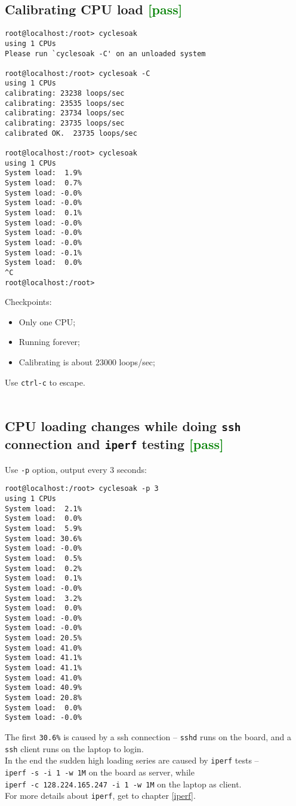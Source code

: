 \documentclass[a4paper]{report}
\begin{document}
\subsection{Calibrating CPU load \textcolor{green}{[pass]}}
\begin{lstlisting}
root@localhost:/root> cyclesoak   
using 1 CPUs
Please run `cyclesoak -C' on an unloaded system

root@localhost:/root> cyclesoak -C
using 1 CPUs
calibrating: 23238 loops/sec
calibrating: 23535 loops/sec
calibrating: 23734 loops/sec
calibrating: 23735 loops/sec
calibrated OK.  23735 loops/sec

root@localhost:/root> cyclesoak 
using 1 CPUs
System load:  1.9%
System load:  0.7%
System load: -0.0%
System load: -0.0%
System load:  0.1%
System load: -0.0%
System load: -0.0%
System load: -0.0%
System load: -0.1%
System load:  0.0%
^C
root@localhost:/root>
\end{lstlisting}
Checkpoints:
\begin{itemize}
    \item Only one CPU;
    \item Running forever;
    \item Calibrating is about 23000 loops/sec;
\end{itemize}
Use {\tt ctrl-c} to escape.\\\\
\subsection{CPU loading changes while doing {\tt ssh} connection 
            and {\tt iperf} testing \textcolor{green}{[pass]}}
Use {\tt -p} option, output every 3 seconds:
\begin{lstlisting}
root@localhost:/root> cyclesoak -p 3
using 1 CPUs
System load:  2.1%
System load:  0.0%
System load:  5.9%
System load: 30.6%
System load: -0.0%
System load:  0.5%
System load:  0.2%
System load:  0.1%
System load: -0.0%
System load:  3.2%
System load:  0.0%
System load: -0.0%
System load: -0.0%
System load: 20.5%
System load: 41.0%
System load: 41.1%
System load: 41.1%
System load: 41.0%
System load: 40.9%
System load: 20.8%
System load:  0.0%
System load: -0.0%
\end{lstlisting}
The first {\tt 30.6\%} is caused by a ssh connection -- {\tt sshd} runs on the board, 
and a {\tt ssh} client runs on the laptop to login.\\
In the end the sudden high loading series are caused by {\tt iperf} tests --\\
{\tt iperf -s -i 1 -w 1M} on the board as server, while \\
{\tt iperf -c 128.224.165.247 -i 1 -w 1M} on the laptop as client.\\
For more details about {\tt iperf}, get to chapter \ref{iperf}.\\\\
\end{document}
